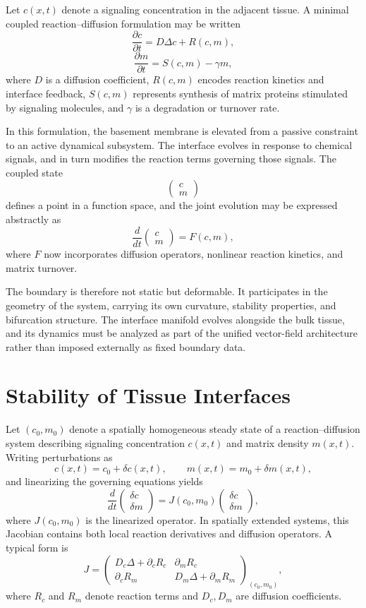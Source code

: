 \documentclass[12pt]{book}
\begin{document}
Let $c(x,t)$ denote a signaling concentration in the adjacent tissue.
A minimal coupled reaction--diffusion formulation may be written
\[
\frac{\partial c}{\partial t}
=
D \Delta c
+
R(c,m),
\]
\[
\frac{\partial m}{\partial t}
=
S(c,m) - \gamma m,
\]
where $D$ is a diffusion coefficient, $R(c,m)$ encodes reaction kinetics
and interface feedback, $S(c,m)$ represents synthesis of matrix proteins
stimulated by signaling molecules, and $\gamma$ is a degradation or
turnover rate.

In this formulation, the basement membrane is elevated from a passive
constraint to an active dynamical subsystem. The interface evolves in
response to chemical signals, and in turn modifies the reaction terms
governing those signals. The coupled state
\[
\begin{pmatrix}
c \\
m
\end{pmatrix}
\]
defines a point in a function space, and the joint evolution may be
expressed abstractly as
\[
\frac{d}{dt}
\begin{pmatrix}
c \\
m
\end{pmatrix}
=
F(c,m),
\]
where $F$ now incorporates diffusion operators, nonlinear reaction
kinetics, and matrix turnover.

The boundary is therefore not static but deformable. It participates
in the geometry of the system, carrying its own curvature, stability
properties, and bifurcation structure. The interface manifold evolves
alongside the bulk tissue, and its dynamics must be analyzed as part
of the unified vector-field architecture rather than imposed externally
as fixed boundary data.

\section{Stability of Tissue Interfaces}

Let $(c_0, m_0)$ denote a spatially homogeneous steady state of a
reaction--diffusion system describing signaling concentration $c(x,t)$
and matrix density $m(x,t)$. Writing perturbations as
\[
c(x,t) = c_0 + \delta c(x,t), 
\qquad
m(x,t) = m_0 + \delta m(x,t),
\]
and linearizing the governing equations yields
\[
\frac{d}{dt}
\begin{pmatrix}
\delta c \\
\delta m
\end{pmatrix}
=
J(c_0,m_0)
\begin{pmatrix}
\delta c \\
\delta m
\end{pmatrix},
\]
where $J(c_0,m_0)$ is the linearized operator. In spatially extended
systems, this Jacobian contains both local reaction derivatives and
diffusion operators. A typical form is
\[
J
=
\begin{pmatrix}
D_c \Delta + \partial_c R_c & \partial_m R_c \\
\partial_c R_m & D_m \Delta + \partial_m R_m
\end{pmatrix}_{(c_0,m_0)},
\]
where $R_c$ and $R_m$ denote reaction terms and $D_c, D_m$ are
diffusion coefficients.
\end{document}
